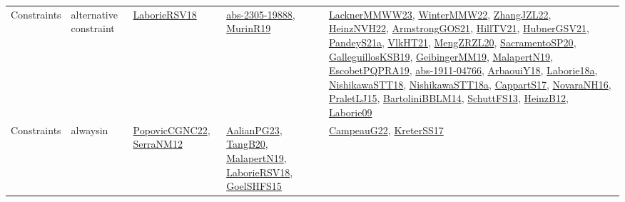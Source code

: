 {\begin{longtable}{lp{3cm}>{\raggedright}p{6cm}>{\raggedright}p{6cm}p{8cm}}
Constraints & alternative constraint & \href{articles/LaborieRSV18.pdf}{LaborieRSV18}\cite{LaborieRSV18} & \href{articles/abs-2305-19888.pdf}{abs-2305-19888}\cite{abs-2305-19888}, \href{papers/MurinR19.pdf}{MurinR19}\cite{MurinR19} & \href{articles/LacknerMMWW23.pdf}{LacknerMMWW23}\cite{LacknerMMWW23}, \href{papers/WinterMMW22.pdf}{WinterMMW22}\cite{WinterMMW22}, \href{papers/ZhangJZL22.pdf}{ZhangJZL22}\cite{ZhangJZL22}, \href{articles/HeinzNVH22.pdf}{HeinzNVH22}\cite{HeinzNVH22}, \href{papers/ArmstrongGOS21.pdf}{ArmstrongGOS21}\cite{ArmstrongGOS21}, \href{papers/HillTV21.pdf}{HillTV21}\cite{HillTV21}, \href{articles/HubnerGSV21.pdf}{HubnerGSV21}\cite{HubnerGSV21}, \href{articles/PandeyS21a.pdf}{PandeyS21a}\cite{PandeyS21a}, \href{articles/VlkHT21.pdf}{VlkHT21}\cite{VlkHT21}, \href{articles/MengZRZL20.pdf}{MengZRZL20}\cite{MengZRZL20}, \href{articles/SacramentoSP20.pdf}{SacramentoSP20}\cite{SacramentoSP20}, \href{papers/GalleguillosKSB19.pdf}{GalleguillosKSB19}\cite{GalleguillosKSB19}, \href{papers/GeibingerMM19.pdf}{GeibingerMM19}\cite{GeibingerMM19}, \href{papers/MalapertN19.pdf}{MalapertN19}\cite{MalapertN19}, \href{articles/EscobetPQPRA19.pdf}{EscobetPQPRA19}\cite{EscobetPQPRA19}, \href{articles/abs-1911-04766.pdf}{abs-1911-04766}\cite{abs-1911-04766}, \href{papers/ArbaouiY18.pdf}{ArbaouiY18}\cite{ArbaouiY18}, \href{papers/Laborie18a.pdf}{Laborie18a}\cite{Laborie18a}, \href{papers/NishikawaSTT18.pdf}{NishikawaSTT18}\cite{NishikawaSTT18}, \href{papers/NishikawaSTT18a.pdf}{NishikawaSTT18a}\cite{NishikawaSTT18a}, \href{papers/CappartS17.pdf}{CappartS17}\cite{CappartS17}, \href{articles/NovaraNH16.pdf}{NovaraNH16}\cite{NovaraNH16}, \href{papers/PraletLJ15.pdf}{PraletLJ15}\cite{PraletLJ15}, \href{papers/BartoliniBBLM14.pdf}{BartoliniBBLM14}\cite{BartoliniBBLM14}, \href{papers/SchuttFS13.pdf}{SchuttFS13}\cite{SchuttFS13}, \href{papers/HeinzB12.pdf}{HeinzB12}\cite{HeinzB12}, \href{papers/Laborie09.pdf}{Laborie09}\cite{Laborie09}\\
Constraints & alwaysin & \href{papers/PopovicCGNC22.pdf}{PopovicCGNC22}\cite{PopovicCGNC22}, \href{papers/SerraNM12.pdf}{SerraNM12}\cite{SerraNM12} & \href{papers/AalianPG23.pdf}{AalianPG23}\cite{AalianPG23}, \href{papers/TangB20.pdf}{TangB20}\cite{TangB20}, \href{papers/MalapertN19.pdf}{MalapertN19}\cite{MalapertN19}, \href{articles/LaborieRSV18.pdf}{LaborieRSV18}\cite{LaborieRSV18}, \href{articles/GoelSHFS15.pdf}{GoelSHFS15}\cite{GoelSHFS15} & \href{articles/CampeauG22.pdf}{CampeauG22}\cite{CampeauG22}, \href{articles/KreterSS17.pdf}{KreterSS17}\cite{KreterSS17}\\

\end{longtable}}
